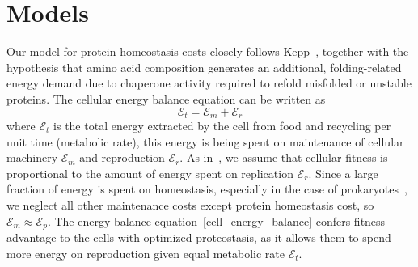\documentclass[10pt,letterpaper]{article}
\begin{document}
\section*{Models}

Our model for protein homeostasis costs closely follows Kepp~\cite{Kepp2014Model}, together with the hypothesis that amino acid composition generates an additional, folding-related energy demand due to chaperone activity required to refold misfolded or unstable proteins. The cellular energy balance equation can be written as
\begin{equation}
	\label{cell_energy_balance}
	\mathcal{E}_{t} = \mathcal{E}_{m} + \mathcal{E}_{r}
\end{equation}
where $\mathcal{E}_{t}$ is the total energy extracted by the cell from food and recycling per unit time (metabolic rate), this energy is being spent on maintenance of cellular machinery $\mathcal{E}_{m}$ and reproduction $\mathcal{E}_{r}$. As in~\cite{Kepp2014Model}, we assume that cellular fitness is proportional to the amount of energy spent on replication $\mathcal{E}_{r}$.  Since a large fraction of energy is spent on homeostasis, especially in the case of prokaryotes~\cite{Harold1987Vital}, we neglect all other maintenance costs except protein homeostasis cost, so $\mathcal{E}_{m}\approx\mathcal{E}_{p}$.
The energy balance equation~\eqref{cell_energy_balance} confers fitness advantage to the cells with optimized proteostasis, as it allows them to spend more energy on reproduction given equal metabolic rate $\mathcal{E}_{t}$. 
\end{document}
